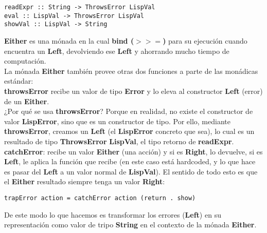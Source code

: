 \begin{minipage}{\linewidth}
\begin{small}
\begin{lstlisting}[frame=single]
readExpr :: String -> ThrowsError LispVal
eval :: LispVal -> ThrowsError LispVal
showVal :: LispVal -> String
\end{lstlisting}
\end{small}
\end{minipage}

\textbf{Either} es una m\'onada en la cual \textbf{bind ($>>=$)} para su ejecuci\'on cuando encuentra un \textbf{Left}, devolviendo ese \textbf{Left} y ahorrando mucho tiempo de computaci\'on.\\

La m\'onada \textbf{Either} tambi\'en provee otras dos funciones a parte de las mon\'adicas est\'andar:\\

\textbf{throwsError} recibe un valor de tipo \textbf{Error} y lo eleva al constructor \textbf{Left} (error) de un \textbf{Either}.\\

¿Por qu\'e se usa \textbf{throwsError}? Porque en realidad, no existe el constructor de valor \textbf{LispError}, sino que es un constructor de tipo. Por ello, mediante \textbf{throwsError}, creamos un \textbf{Left} (el \textbf{LispError} concreto que sea), lo cual es un resultado de tipo \textbf{ThrowsError} \textbf{LispVal}, el tipo retorno de \textbf{readExpr}.\\

\textbf{catchError}: recibe un valor \textbf{Either} (una acci\'on) y si es \textbf{Right}, lo devuelve, si es \textbf{Left}, le aplica la funci\'on que recibe (en este caso est\'a hardcoded, y lo que hace es pasar del \textbf{Left} a un valor normal de \textbf{LispVal}). El sentido de todo esto es que
el \textbf{Either} resultado siempre tenga un valor \textbf{Right}:\\

\begin{minipage}{\linewidth}
\begin{small}
\begin{lstlisting}[frame=single]
trapError action = catchError action (return . show)
\end{lstlisting}
\end{small}
\end{minipage}

De este modo lo que hacemos es transformar los errores (\textbf{Left}) en su representaci\'on como valor de tripo \textbf{String} en el contexto de la m\'onada \textbf{Either}.\\

